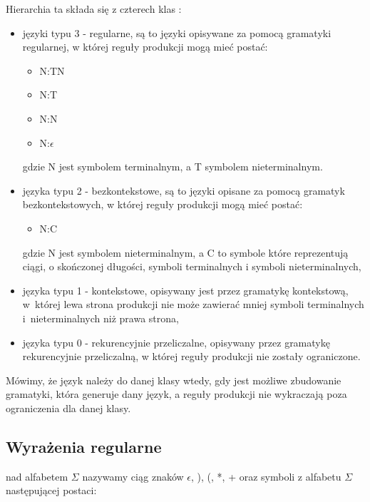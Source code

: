 Hierarchia ta składa się z czterech klas \cite{aho, link_eng_chomsky, link_pl_chomsky}:
\begin{itemize}
\item języki typu 3 - regularne, są to języki opisywane za pomocą gramatyki regularnej,
		      w której reguły produkcji mogą mieć postać:
		      \begin{itemize}
			\item   N:TN
			\item   N:T
			\item   N:N
			\item   N:$\epsilon$
		      \end{itemize}
		      gdzie N jest symbolem terminalnym, a T symbolem nieterminalnym.
\item języka typu 2 - bezkontekstowe, są to języki opisane za pomocą gramatyk bezkontekstowych,
		      w której reguły produkcji mogą mieć postać:
				\begin{itemize}
				 \item N:C
				\end{itemize}
		gdzie N jest symbolem nieterminalnym, a C  to symbole które reprezentują ciągi,
		o skończonej długości, symboli terminalnych i symboli nieterminalnych,	  
			   
\item języka typu 1 - kontekstowe, opisywany jest przez gramatykę kontekstową, w~której lewa strona produkcji nie może
		      zawierać mniej symboli terminalnych i~nieterminalnych niż prawa strona,

\item języka typu 0 - rekurencyjnie przeliczalne, opisywany przez gramatykę rekurencyjnie przeliczalną,  
		      w której reguły produkcji nie zostały ograniczone. 
  
\end{itemize}
 
Mówimy, że język należy do danej klasy wtedy, gdy jest możliwe zbudowanie gramatyki, która generuje dany język, 
a reguły produkcji nie wykraczają poza ograniczenia dla danej klasy.


\subsection{Wyrażenia regularne}

 nad alfabetem $\Sigma$ nazywamy ciąg znaków  $\epsilon$, ), (, *, + oraz symboli z alfabetu $\Sigma$ następującej postaci:

